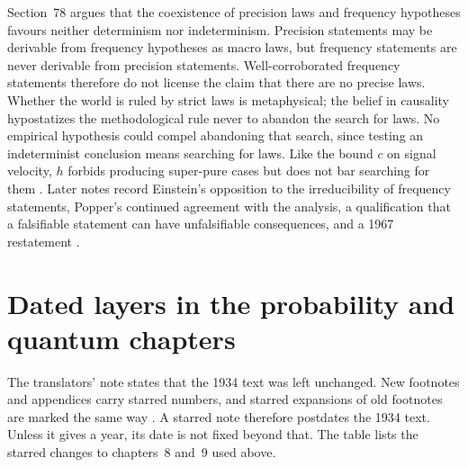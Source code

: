 Section~78 argues that the coexistence of precision laws and frequency
hypotheses favours neither determinism nor indeterminism. Precision
statements may be derivable from frequency hypotheses as macro laws, but
frequency statements are never derivable from precision statements.
Well-corroborated frequency statements therefore do not license the
claim that there are no precise laws. Whether the world is ruled by
strict laws is metaphysical; the belief in causality hypostatizes the
methodological rule never to abandon the search for laws. No empirical
hypothesis could compel abandoning that search, since testing an
indeterminist conclusion means searching for laws. Like the bound \(c\)
on signal velocity, \(h\) forbids producing super-pure cases but does
not bar searching for them \parencite[\S78]{Popper2002LogicDiscoveryUI}.
Later notes record Einstein's opposition to the irreducibility of
frequency statements, Popper's continued agreement with the analysis, a
qualification that a falsifiable statement can have unfalsifiable
consequences, and a 1967 restatement
\parencite[\S78, notes~*1, *2, *4, *6]{Popper2002LogicDiscoveryUI}.

\section{Dated layers in the probability and quantum chapters}
\label{sec:p15-w02b-p15-027-later-notes}

The translators' note states that the 1934 text was left unchanged. New
footnotes and appendices carry starred numbers, and starred expansions of
old footnotes are marked the same way
\parencite[translators' note]{Popper2002LogicDiscoveryUI}. A starred note
therefore postdates the 1934 text. Unless it gives a year, its date is
not fixed beyond that. The table lists the starred changes to chapters~8
and~9 used above.

